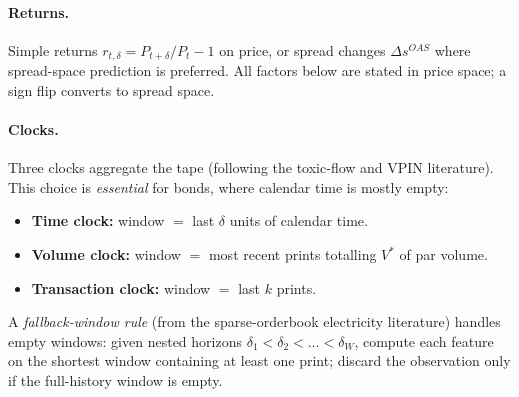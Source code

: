 \documentclass[11pt]{article}
\newcounter{fac}
\begin{document}
\paragraph{Returns.} Simple returns $r_{t,\delta} = P_{t+\delta}/P_t - 1$ on price, or spread changes $\Delta s^{OAS}$ where spread-space prediction is preferred. All factors below are stated in price space; a sign flip converts to spread space.

\paragraph{Clocks.} Three clocks aggregate the tape (following the toxic-flow and VPIN literature). This choice is \emph{essential} for bonds, where calendar time is mostly empty:
\begin{itemize}[itemsep=1pt]
\item \textbf{Time clock:} window $=$ last $\delta$ units of calendar time.
\item \textbf{Volume clock:} window $=$ most recent prints totalling $V^\ast$ of par volume.
\item \textbf{Transaction clock:} window $=$ last $k$ prints.
\end{itemize}
A \emph{fallback-window rule} (from the sparse-orderbook electricity literature) handles empty windows: given nested horizons $\delta_1 < \delta_2 < \dots < \delta_W$, compute each feature on the shortest window containing at least one print; discard the observation only if the full-history window is empty.
\end{document}
